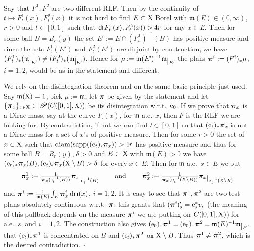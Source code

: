 \documentclass[11pt]{article}
\numberwithin{equation}{section}
\newenvironment{idea}{\removelastskip\par\medskip   %
\noindent{\em Idea of the proof} \rm}{\penalty-20\null\hfill$\square$\par\medbreak}
\newcommand{\ppi}{{\mbox{\boldmath$\pi$}}}
\newcommand{\sppi}{{\mbox{\scriptsize\boldmath$\pi$}}}
\newcommand{\restr}[1]{\lower3pt\hbox{$|_{#1}$}}
\newcommand{\pr}{\mathscr P}
\newcommand{\e}{{\rm e}}
\newcommand{\X}{{\rm X}}
\newcommand{\sfd}{{\sf d}}
\newcommand{\mm}{{\mathfrak m}}
\renewcommand{\d}{{\rm d}}
\newcommand{\supp}{{\rm supp}}
\begin{document}
\begin{idea}\ \\ 
 Say that $F^1,F^2$ are two different RLF. 
Then by the continuity of $t\mapsto F^1_t(x),F^2_t(x)$ it is not hard to find $E\subset\X$ Borel with $\mm(E)\in(0,\infty)$, $r>0$ and $t\in[0,1]$ such that $\sfd(F^1_t(x),F^2_t(x))>4r$ for any $x\in E$. Then for some ball $B=B_r(y)$ the set $E':=E\cap (F^1_t)^{-1}(B)$ has positive measure and since the sets $F^1_t(E')$ and $F^2_t(E')$ are disjoint by construction, we have $(F^1_t)_*(\mm\restr{E'})\neq (F^2_t)_*(\mm\restr{E'})$. Hence for $\mu:=\mm(E')^{-1}\mm\restr{E'}$ the plans $\ppi^i:=(F^i_\cdot)_*\mu$, $i=1,2$, would be as in the statement and different.

 We rely on the disintegration theorem and on the same basic principle just used. Say $\mm(\X)=1$, pick $\mu:=\mm$, let $\ppi$ be given by the statement and let $\{\ppi_x\}_{x\in\X}\subset\pr(C([0,1],\X))$ be its disintegration w.r.t.\ $\e_0$. If we prove that $\ppi_x$ is a Dirac mass, say at the curve $F_\cdot(x)$, for $\mm$-a.e.\ $x$, then $F$ is the RLF we are looking for. By contradiction, if not we can find $t\in[0,1]$ so that $(\e_t)_*\ppi_x$ is not a Dirac mass for a set of $x$'s of positive measure. Then for some $r>0$ the set of $x\in\X$ such that ${\rm diam}(\supp((\e_t)_*\ppi_x))>4r$ has positive measure and thus for some ball $B=B_r(y)$, $\delta>0$ and $E\subset\X$ with $\mm(E)>0$ we have $(\e_t)_*\ppi_x(B),(\e_t)_*\ppi_x(\X\setminus B)>\delta$ for every $x\in E$. Then for $\mm$-a.e.\ $x\in E$ we put
\[
\ppi^1_x:=\tfrac1{\sppi_x({\e_t^{-1}(B)})}\ppi_x\restr{\e_t^{-1}(B)}\qquad\text{ and }\qquad\ppi^2_x:=\tfrac1{\sppi_x({\e_t^{-1}(\X\setminus B)})}\ppi_x\restr{\e_t^{-1}(\X\setminus B)}
\]
and $\ppi^i:=\tfrac1{\mm(E)}\int_E\ppi^i_x\,\d\mm(x)$, $i=1,2$. It is easy to see that $\ppi^1,\ppi^2$ are two test plans absolutely continuous w.r.t.\ $\ppi$: this grants that $(\ppi^i)'_s=\e^*_sv_s$ (the meaning of this pullback depends on the measure $\ppi^i$ we are putting on $C([0,1],\X)$) for a.e.\ $s$, and $i=1,2$. The construction also gives $(\e_0)_*\ppi^1=(\e_0)_*\ppi^2=\mm(E)^{-1}\mm\restr E$, that  $(\e_t)_*\ppi^1$ is concentrated on $B$ and  $(\e_t)_*\ppi^2$ on $\X\setminus B$. Thus $\ppi^1\neq\ppi^2$, which is the desired contradiction. 
\end{idea}
\end{document}
